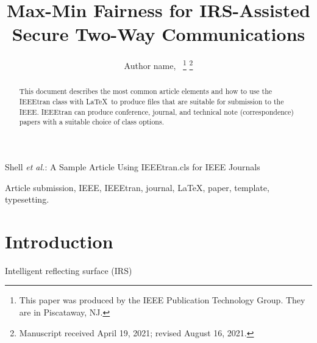 \documentclass[lettersize,journal]{IEEEtran}
\begin{document}
\title{Max-Min Fairness for IRS-Assisted Secure Two-Way Communications}

\author{Author name,~
\thanks{This paper was produced by the IEEE Publication Technology Group. They are in Piscataway, NJ.}%
\thanks{Manuscript received April 19, 2021; revised August 16, 2021.}}

%
{Shell \MakeLowercase{\textit{et al.}}: A Sample Article Using IEEEtran.cls for IEEE Journals}


\maketitle

\begin{abstract}
This document describes the most common article elements and how to use the IEEEtran class with \LaTeX \ to produce files that are suitable for submission to the IEEE.  IEEEtran can produce conference, journal, and technical note (correspondence) papers with a suitable choice of class options. 
\end{abstract}

\begin{IEEEkeywords}
Article submission, IEEE, IEEEtran, journal, \LaTeX, paper, template, typesetting.
\end{IEEEkeywords}

\section{Introduction}

Intelligent reflecting surface (IRS)

\end{document}
